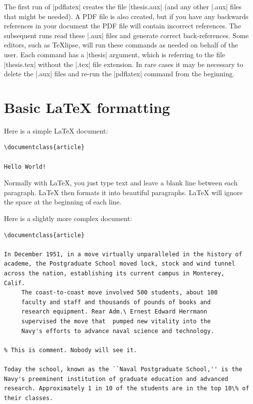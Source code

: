 The first run of |pdflatex| creates the file |thesis.aux| (and any
other |.aux| files that might be needed).  A PDF file is also created,
but if you have any backwards references in your document the PDF file
will contain incorrect references. The subsequent runs read
these |.aux| files and generate correct back-references. Some editors, such as {\TeX}lipse, will run these commands as needed on behalf of the user.  Each command has a |thesis| argument, which is
 referring to the file |thesis.tex| without the |.tex| file extension.
 In rare cases it may be necessary to delete the |.aux| files and
 re-run the |pdflatex| command from the beginning.

\section{Basic \LaTeX{} formatting}
Here is a simple \LaTeX{} document:
\begin{Verbatim}
\documentclass{article}

Hello World!

\end{Verbatim}

Normally with \LaTeX{}, you just type text and leave a blank line between
each paragraph. \LaTeX{} then formats it into beautiful
paragraphs. \LaTeX{} will ignore the space at the beginning of each line.

Here is a slightly more complex document:

\begin{Verbatim}
\documentclass{article}

In December 1951, in a move virtually unparalleled in the history of
academe, the Postgraduate School moved lock, stock and wind tunnel
across the nation, establishing its current campus in Monterey,
Calif. 
     The coast-to-coast move involved 500 students, about 100
     faculty and staff and thousands of pounds of books and 
     research equipment. Rear Adm.\ Ernest Edward Herrmann 
     supervised the move that  pumped new vitality into the
     Navy's efforts to advance naval science and technology.

% This is comment. Nobody will see it.

Today the school, known as the ``Naval Postgraduate School,'' is the
Navy's preeminent institution of graduate education and advanced
research. Approximately 1 in 10 of the students are in the top 10\% of
their classes.

\end{Verbatim}


